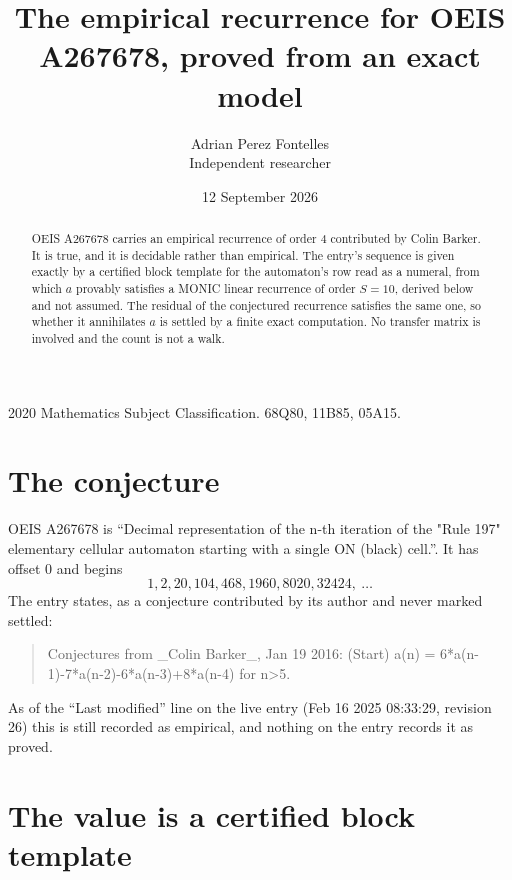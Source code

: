 \documentclass[11pt,a4paper]{article}
\title{The empirical recurrence for OEIS A267678, proved from an exact model}
\author{Adrian Perez Fontelles\\ \small Independent researcher}
\date{12 September 2026}
\theoremstyle{plain}
\theoremstyle{definition}
\begin{document}
\maketitle

\begin{abstract}
OEIS A267678 carries an empirical recurrence of order $4$ contributed by Colin Barker. It is true, and it is
decidable rather than empirical. The entry's sequence is given exactly by a certified block template for the automaton's row read as a numeral, from
which $a$ provably satisfies a MONIC linear recurrence of order $S=10$, derived below and not
assumed. The residual of the conjectured recurrence satisfies the same one, so whether it
annihilates $a$ is settled by a finite exact computation. No transfer matrix is involved and
the count is not a walk.
\end{abstract}

\noindent\small 2020 Mathematics Subject Classification. 68Q80, 11B85, 05A15.\normalsize

\section{The conjecture}

OEIS A267678 is ``Decimal representation of the n-th iteration of the "Rule 197" elementary cellular automaton starting with a single ON (black) cell.''. It has offset $0$ and begins
\[
1, 2, 20, 104, 468, 1960, 8020, 32424,\ \dots
\]
The entry states, as a conjecture contributed by its author and never marked settled:
\begin{quote}
Conjectures from \_Colin Barker\_, Jan 19 2016: (Start) a(n) = 6*a(n-1)-7*a(n-2)-6*a(n-3)+8*a(n-4) for n>5.
\end{quote}
As of the ``Last modified'' line on the live entry (Feb 16 2025 08:33:29, revision 26)
this is still recorded as empirical, and nothing on the entry records it as proved.

\section{The value is a certified block template}
\end{document}
